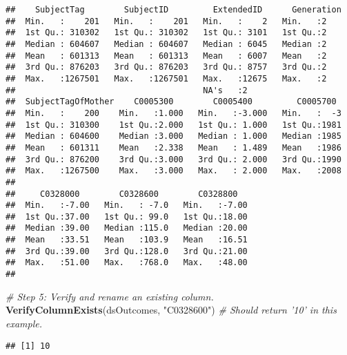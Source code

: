 \documentclass[smallextended]{svjour3}       %
\newenvironment{Shaded}{\begin{snugshade}}{\end{snugshade}}
\newcommand{\CommentTok}[1]{\textcolor[rgb]{0.56,0.35,0.01}{\textit{#1}}}
\newcommand{\KeywordTok}[1]{\textcolor[rgb]{0.13,0.29,0.53}{\textbf{#1}}}
\newcommand{\NormalTok}[1]{#1}
\newcommand{\StringTok}[1]{\textcolor[rgb]{0.31,0.60,0.02}{#1}}
\begin{document}
\begin{verbatim}
##    SubjectTag        SubjectID         ExtendedID      Generation
##  Min.   :    201   Min.   :    201   Min.   :    2   Min.   :2   
##  1st Qu.: 310302   1st Qu.: 310302   1st Qu.: 3101   1st Qu.:2   
##  Median : 604607   Median : 604607   Median : 6045   Median :2   
##  Mean   : 601313   Mean   : 601313   Mean   : 6007   Mean   :2   
##  3rd Qu.: 876203   3rd Qu.: 876203   3rd Qu.: 8757   3rd Qu.:2   
##  Max.   :1267501   Max.   :1267501   Max.   :12675   Max.   :2   
##                                      NA's   :2                   
##  SubjectTagOfMother    C0005300        C0005400         C0005700   
##  Min.   :    200    Min.   :1.000   Min.   :-3.000   Min.   :  -3  
##  1st Qu.: 310300    1st Qu.:2.000   1st Qu.: 1.000   1st Qu.:1981  
##  Median : 604600    Median :3.000   Median : 1.000   Median :1985  
##  Mean   : 601311    Mean   :2.338   Mean   : 1.489   Mean   :1986  
##  3rd Qu.: 876200    3rd Qu.:3.000   3rd Qu.: 2.000   3rd Qu.:1990  
##  Max.   :1267500    Max.   :3.000   Max.   : 2.000   Max.   :2008  
##                                                                    
##     C0328000        C0328600        C0328800    
##  Min.   :-7.00   Min.   : -7.0   Min.   :-7.00  
##  1st Qu.:37.00   1st Qu.: 99.0   1st Qu.:18.00  
##  Median :39.00   Median :115.0   Median :20.00  
##  Mean   :33.51   Mean   :103.9   Mean   :16.51  
##  3rd Qu.:39.00   3rd Qu.:128.0   3rd Qu.:21.00  
##  Max.   :51.00   Max.   :768.0   Max.   :48.00  
## 
\end{verbatim}

\begin{Shaded}
\begin{Highlighting}[]
\CommentTok{# Step 5: Verify and rename an existing column.}
\KeywordTok{VerifyColumnExists}\NormalTok{(dsOutcomes, }\StringTok{"C0328600"}\NormalTok{) }\CommentTok{# Should return '10' in this example.}
\end{Highlighting}
\end{Shaded}

\begin{verbatim}
## [1] 10
\end{verbatim}
\end{document}
